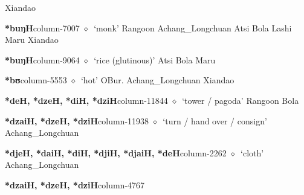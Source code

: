          Xiandao 
  \item {\footnotesize \textbf{*buŋH}}{\tiny column-7007}
         $\diamond$~`monk'
         Rangoon 
\hspace{1ex}
         Achang\_Longchuan 
\hspace{1ex}
         Atsi 
\hspace{1ex}
         Bola 
\hspace{1ex}
         Lashi 
\hspace{1ex}
         Maru 
\hspace{1ex}
         Xiandao 
  \item {\footnotesize \textbf{*buŋH}}{\tiny column-9064}
         $\diamond$~`rice (glutinous)'
         Atsi 
\hspace{1ex}
         Bola 
\hspace{1ex}
         Maru 
  \item {\footnotesize \textbf{*bʊ}}{\tiny column-5553}
         $\diamond$~`hot'
         OBur. 
\hspace{1ex}
         Achang\_Longchuan 
\hspace{1ex}
         Xiandao 
  \item {\footnotesize \textbf{*deH, *dzeH, *diH, *dziH}}{\tiny column-11844}
         $\diamond$~`tower / pagoda'
         Rangoon 
\hspace{1ex}
         Bola 
  \item {\footnotesize \textbf{*dzaiH, *dzeH, *dziH}}{\tiny column-11938}
         $\diamond$~`turn / hand over / consign'
         Achang\_Longchuan 
  \item {\footnotesize \textbf{*djeH, *daiH, *diH, *djiH, *djaiH, *deH}}{\tiny column-2262}
         $\diamond$~`cloth'
         Achang\_Longchuan 
  \item {\footnotesize \textbf{*dzaiH, *dzeH, *dziH}}{\tiny column-4767}
